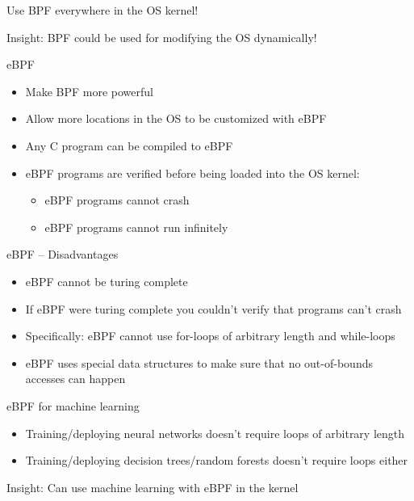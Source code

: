 \documentclass[xcolor={dvipsnames}]{beamer}
\begin{document}
\begin{frame}{Use BPF everywhere in the OS kernel!}
\begin{block}{Insight:}
BPF could be used for modifying the OS dynamically! 
\end{block}
\end{frame}

\begin{frame}{eBPF}
\begin{itemize}
\item Make BPF more powerful
\item Allow more locations in the OS to be customized with eBPF
\item Any C program can be compiled to eBPF
\item eBPF programs are verified before being loaded into the OS kernel:
\begin{itemize}
\item eBPF programs cannot crash
\item eBPF programs cannot run infinitely
\end{itemize}
\end{itemize}
\end{frame}

\begin{frame}{eBPF -- Disadvantages}
\begin{itemize}
\item eBPF cannot be turing complete
\item If eBPF were turing complete you couldn't verify that programs can't crash
\item Specifically: eBPF cannot use for-loops of arbitrary length and while-loops
\item eBPF uses special data structures to make sure that no out-of-bounds accesses can happen
\end{itemize}
\end{frame}

\begin{frame}{eBPF for machine learning}
\begin{itemize}
\item Training/deploying neural networks doesn't require loops of arbitrary length
\item Training/deploying decision trees/random forests doesn't require loops either
\end{itemize}
\pause
\begin{block}{Insight:}
Can use machine learning with eBPF in the kernel
\end{block}
\end{frame}
\end{document}
